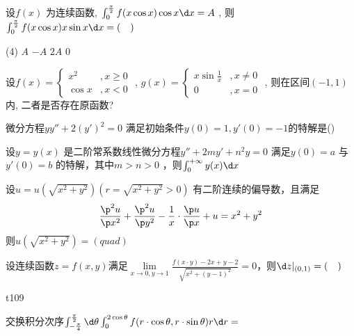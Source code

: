 \begin{question}
    设$ f(x) $ 为连续函数, $ \int_{0}^{\frac{\pi}{2}} f(x \cos x) \cos x \d x = A $ , 则$ \int_{0}^{\frac{\pi}{2}} f(x \cos x) x \sin x \d x = (\quad) $ 
    \begin{tasks}(4)
        \task   $ A $ 
        \task   $ -A $ 
        \task   $ 2A $ 
        \task   $ 0 $ 
    \end{tasks}
\end{question}
\begin{question}
    设$ f(x) = \begin{cases}
        x^2 &, x \ge 0   \\
        \cos x &, x < 0
    \end{cases} $ , $ g(x) = \begin{cases}
        x \sin \frac 1 x &, x \neq 0  \\
        0 &, x = 0
    \end{cases} $ , 则在区间$ (-1, 1) $ 内, 二者是否存在原函数?
\end{question}

\begin{question}
    微分方程$ yy'' + 2(y')^2 = 0 $ 满足初始条件$ y(0) = 1, y'(0) = - 1$的特解是(\quad)
\end{question}

\begin{question}
    设$ y = y(x) $ 是二阶常系数线性微分方程$ y'' + 2my' + n^2 y = 0 $ 满足$ y(0) = a $ 与$ y'(0) = b $ 的特解，其中$ m > n > 0 $ ，则$ \int_{0}^{+\infty} y(x)\d x $ 
\end{question}

\begin{question}
    设$ u = u(\sqrt{x^2 + y^2})(r = \sqrt{x^2 + y^2} > 0) $ 有二阶连续的偏导数，且满足
    \begin{equation*}
        \frac{\p^2 u}{\p x^2} + \frac{\p^2 u}{\p y^2} - \frac{1}{x} \cdot \frac{\p u}{\p x} + u = x^2 + y^2
    \end{equation*}
    则$ u(\sqrt{x^2 + y^2}) = (quad) $ 
\end{question}

\begin{question}
    设连续函数$ z = f(x,y) $满足$ \lim\limits_{x \to 0, y \to 1} \frac{f(x \cdot y) - 2x + y - 2}{\sqrt{x^2 + (y - 1)^2}} = 0 $，则$ \d z|_{(0,1)} = (\quad) $   
\end{question}

\begin{question}
    t109

    交换积分次序$ \int_{-\frac{\pi}{4}}^{\frac{\pi}{2}} \d\theta \int_{0}^{2\cos\theta} f(r\cdot\cos\theta, r\cdot\sin\theta) r \d r = $ 
\end{question}

